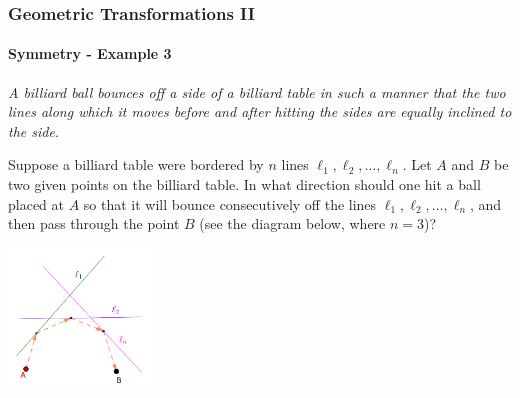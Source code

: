 \documentclass[8pt,xcolor=table,dvipsnames]{beamer}
\begin{document}
\begin{frame}[t]
    \frametitle{Geometric Transformations II}
    \framesubtitle{Symmetry - Example 3}
    \begin{example}
        \textit{A billiard ball bounces off a side of a billiard table in such a manner that the two lines along
        which it moves before and after hitting the sides are equally inclined to the side.}

        Suppose a billiard table were bordered by $n$ lines $\ell_1, \ell_2, \ldots, \ell_n$.
        Let $A$ and $B$ be two given points on the billiard table.
        In what direction should one hit a ball placed at $A$
        so that it will bounce consecutively off the lines $\ell_1, \ell_2, \ldots, \ell_n$,
        and then pass through the point $B$ (see the diagram below, where $n = 3$)?
    \end{example}

    \begin{center}
        \includegraphics[width=4cm]{./svg/pdf/symmetry-3a.pdf}
    \end{center}
\end{frame}
\end{document}

